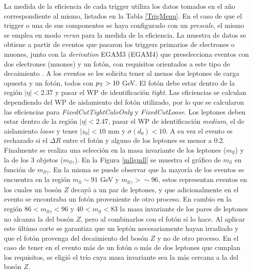 La medida de la eficiencia de cada trigger utiliza los datos tomados en el año correspondiente al mismo, listados en la Tabla \ref{TrigMenu}. En el caso de que el trigger o una de sus componentes se haya configurado con un \textit{prescale}, el mismo se emplea en modo \textit{rerun} para la medida de la eficiencia. La muestra de datos se obtiene a partir de eventos que pasaron los triggers primarios de electrones o muones, junto con la \textit{derivation} EGAM3 (EGAM4) que preselecciona eventos con dos electrones (muones) y un fotón, con requisitos orientados a este tipo de decaimiento . A los eventos se les solicita tener al menos dos leptones de carga opuesta y un fotón, todos con $p_{\text{T}}>10$ GeV. El fotón debe estar dentro de la región $|\eta| < 2.37$ y pasar el WP de identificación \textit{tight}. Las eficiencias se calculan dependiendo del WP de aislamiento del fotón utilizado, por lo que se calcularon las eficiencias para \textit{FixedCutTightCaloOnly} y \textit{FixedCutLoose}. Los leptones deben estar dentro de la región $|\eta| < 2.47$, pasar el WP de identificación \textit{medium}, el de aislamiento \textit{loose} y tener $|z_0| < 10$ mm y $\sigma(d_0) < 10$. A su vez el evento es rechazado si el $\Delta R$ entre el fotón y alguno de los leptones es menor a 0.2. Finalmente se realiza una selección en la masa invariante de los leptones ($m_{ll}$) y la de los 3 objetos ($m_{ll\gamma}$). En la Figura \ref{mllgmll} se muestra el gráfico de $m_{ll}$ en función de $m_{ll\gamma}$. En la misma se puede observar que la mayoría de los eventos se encuentra en la región $m_{ll}\sim91$ GeV y $m_{ll\gamma}>\sim96$, estos representan eventos en los cuales un bosón $Z$ decayó a un par de leptones, y que adicionalmente en el evento se encontraba un fotón proveniente de otro proceso. En cambio en la región $86<m_{ll\gamma}<96$ y $40<m_{ll}<83$ la masa invariante de los pares de leptones no alcanza la del bosón $Z$, pero al combinarlos con el fotón sí lo hace. Al aplicar este último corte se garantiza que un leptón necesariamente hayan irradiado y que el fotón provenga del decaimiento del bosón $Z$ y no de otro proceso. En el caso de tener en el evento más de un fotón o más de dos leptones que cumplan los requisitos, se eligió el trío cuya masa invariante sea la más cercana a la del bosón $Z$.

